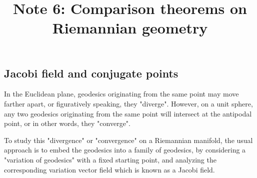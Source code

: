 \documentclass{ctexart}
\title{Note 6: Comparison theorems on Riemannian geometry}
\date{} %
\begin{document}
\maketitle

\subsection*{Jacobi field and conjugate points}

In the Euclidean plane, geodesics originating from the same point may move farther apart, or figuratively speaking, they "diverge". However, on a unit sphere, 
any two geodesics originating from the same point will intersect at the antipodal point, or in other words, they "converge".

To study this "divergence" or "convergence" on a Riemannian manifold, the usual approach is to embed the geodesics into a family of geodesics, 
by considering a "variation of geodesics" with a fixed starting point, and analyzing the corresponding variation vector field which is known as a Jacobi field. 
\end{document}
